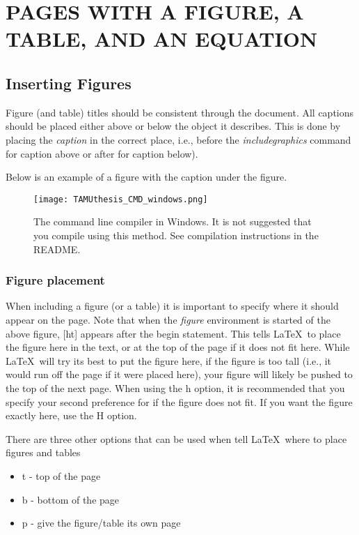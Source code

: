 


\chapter{PAGES WITH A FIGURE, A TABLE, AND AN EQUATION}
\section{Inserting Figures}

Figure (and table) titles should be consistent through the document. All captions should be placed either above or below the object it describes. This is done by placing the \textit{caption} in the correct place, i.e., before the {\it includegraphics} command for caption above or after for caption below).

Below is an example of a figure with the caption under the figure.
\begin{figure}[ht]
   \centering
   \texttt{[image: TAMUthesis\_CMD\_windows.png]}
   \caption[The command line compiler in Windows.]{The command line compiler in Windows. It is not suggested that you compile using this method. See compilation instructions in the README.}
   \label{fig:CMD_1}
\end{figure}

\subsection{Figure placement}
When including a figure (or a table) it is important to specify where it should appear on the page. Note that when the {\it figure} environment is started of the above figure, [ht] appears after the begin statement. This tells \LaTeX\ to place the figure here in the text, or at the top of the page if it does not fit here. While \LaTeX\ will try its best to put the figure here, if the figure is too tall (i.e., it would run off the page if it were placed here), your figure will likely be pushed to the top of the next page. When using the h option, it is recommended that you specify your second preference for if the figure does not fit. If you want the figure exactly here, use the H option.

There are three other options that can be used when tell \LaTeX\ where to place figures and tables
\begin{itemize}
  \item t - top of the page
  \item b - bottom of the page
  \item p - give the figure/table its own page
\end{itemize}

